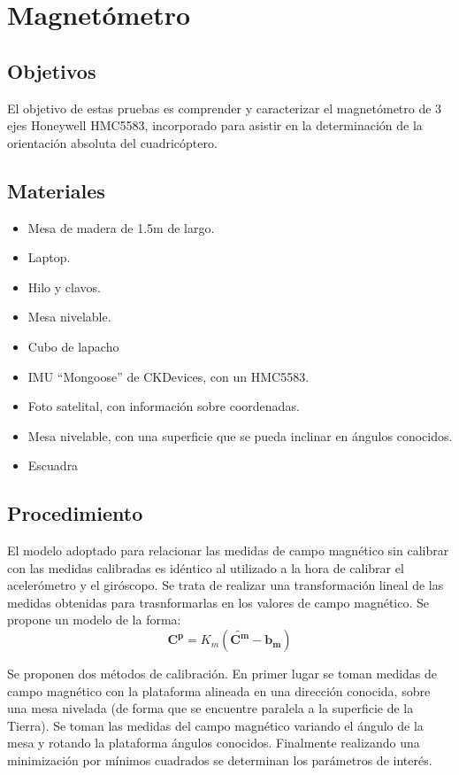\documentclass[spanish,12pt,a4paper,titlepage]{report}
\begin{document}
\chapter{Magnetómetro}
\label{chap:magnetometro}

\section{Objetivos}

El objetivo de estas pruebas es comprender y caracterizar el magnetómetro de 3 ejes Honeywell HMC5583, incorporado para asistir en la determinación de la orientación absoluta del cuadricóptero.

\section{Materiales}
\label{sec:materiales}

\begin{itemize}
\item Mesa de madera de 1.5m de largo.
\item Laptop.
\item Hilo y clavos.
\item Mesa nivelable.
\item Cubo de lapacho
\item IMU ``Mongoose'' de CKDevices, con un HMC5583.
\item Foto satelital, con información sobre coordenadas.
\item Mesa nivelable, con una superficie que se pueda inclinar en ángulos conocidos.
\item Escuadra
\end{itemize}

\newpage

\section{Procedimiento}
\label{sec:procedimiento}

El modelo adoptado para relacionar las medidas de campo magnético sin calibrar con las medidas calibradas es idéntico al utilizado a la hora de calibrar el acelerómetro y el giróscopo. Se trata de realizar una transformación lineal de las medidas obtenidas para trasnformarlas en los valores de campo magnético. Se propone un modelo de la forma:
$$
\mathbf{C^p} =K_m (\mathbf{\tilde{C^m}} -  \mathbf{b_m})
$$

Se proponen dos métodos de calibración. En primer lugar se toman medidas de campo magnético con la plataforma alineada en una dirección conocida, sobre una mesa nivelada (de forma que se encuentre paralela a la superficie de la Tierra). Se toman las medidas del campo magnético variando el ángulo de la mesa y rotando la plataforma ángulos conocidos. Finalmente realizando una minimización por mínimos cuadrados se determinan los parámetros de interés.  
\end{document}
